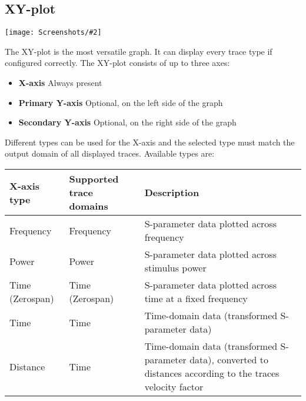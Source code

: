 \documentclass[a4paper,11pt]{article}
\newcommand{\screenshot}[2]{\begin{center}
\texttt{[image: Screenshots/\#2]}
\end{center}}
\begin{document}
\subsection{XY-plot}
\screenshot{1.0}{GraphXYplot.png}
The XY-plot is the most versatile graph. It can display every trace type if configured correctly. The XY-plot consists of up to three axes:
\begin{itemize}
\item \textbf{X-axis} Always present
\item \textbf{Primary Y-axis} Optional, on the left side of the graph
\item \textbf{Secondary Y-axis} Optional, on the right side of the graph
\end{itemize}
Different types can be used for the X-axis and the selected type must match the output domain of all displayed traces. Available types are:
\begin{center}
\begin{threeparttable}
\begin{tabularx}{\textwidth}{L{3cm}|X|L{7cm}}
    \toprule
    \textbf{X-axis type} & \textbf{Supported trace domains} & \textbf{Description} \\
    \hline
    Frequency & Frequency & S-parameter data plotted across frequency \\
    \hline
    Power & Power & S-parameter data plotted across stimulus power \\
    \hline
    Time (Zerospan) & Time (Zerospan) & S-parameter data plotted across time at a fixed frequency \\
    \hline
    Time & Time & Time-domain data (transformed S-parameter data) \\
\hline
    Distance & Time & Time-domain data (transformed S-parameter data), converted to distances according to the traces velocity factor \\
      \bottomrule
\end{tabularx}
\end{threeparttable}
\end{center}
\end{document}
